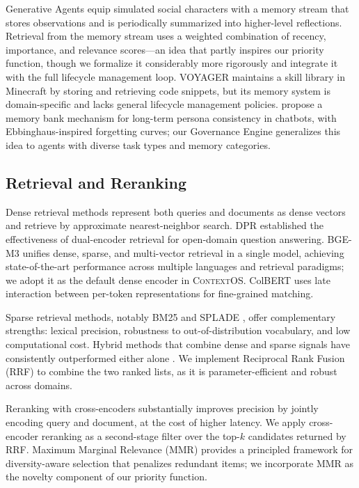 \documentclass[review,12pt]{elsarticle}
\newcommand{\contextos}{\textsc{ContextOS}}
\begin{document}
Generative Agents \citep{park2023generative} equip simulated social characters
with a memory stream that stores observations and is periodically summarized
into higher-level reflections.  Retrieval from the memory stream uses a weighted
combination of recency, importance, and relevance scores—an idea that partly
inspires our priority function, though we formalize it considerably more
rigorously and integrate it with the full lifecycle management loop.  VOYAGER
\citep{wang2023voyager} maintains a skill library in Minecraft by storing and
retrieving code snippets, but its memory system is domain-specific and lacks
general lifecycle management policies.  \citet{zhong2024memorybank} propose a
memory bank mechanism for long-term persona consistency in chatbots, with
Ebbinghaus-inspired forgetting curves; our Governance Engine generalizes this
idea to agents with diverse task types and memory categories.

\subsection{Retrieval and Reranking}
\label{subsec:retrieval}

Dense retrieval methods represent both queries and documents as dense vectors
and retrieve by approximate nearest-neighbor search.  DPR \citep{karpukhin2020dpr}
established the effectiveness of dual-encoder retrieval for open-domain question
answering.  BGE-M3 \citep{chen2024bgem3} unifies dense, sparse, and multi-vector
retrieval in a single model, achieving state-of-the-art performance across
multiple languages and retrieval paradigms; we adopt it as the default dense
encoder in \contextos{}.  ColBERT \citep{khattab2020colbert} uses late
interaction between per-token representations for fine-grained matching.

Sparse retrieval methods, notably BM25 \citep{robertson2009bm25} and SPLADE
\citep{formal2021splade}, offer complementary strengths: lexical precision,
robustness to out-of-distribution vocabulary, and low computational cost.
Hybrid methods that combine dense and sparse signals have consistently
outperformed either alone \citep{chen2022hybrid,ma2022hybrid}.  We implement
Reciprocal Rank Fusion (RRF) \citep{cormack2009rrf} to combine the two ranked
lists, as it is parameter-efficient and robust across domains.

Reranking with cross-encoders \citep{nogueira2019passage} substantially improves
precision by jointly encoding query and document, at the cost of higher latency.
We apply cross-encoder reranking as a second-stage filter over the top-$k$
candidates returned by RRF.  Maximum Marginal Relevance (MMR)
\citep{carbonell1998mmr} provides a principled framework for diversity-aware
selection that penalizes redundant items; we incorporate MMR as the novelty
component of our priority function.
\end{document}
